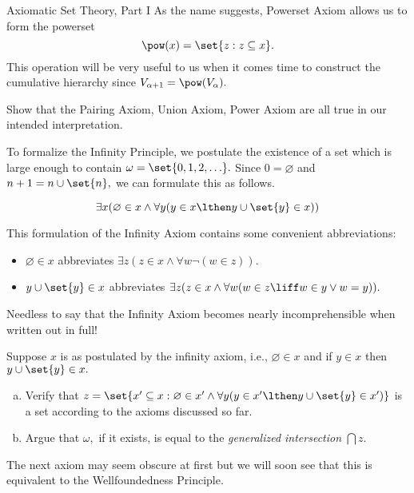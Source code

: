 \begin{unit}{Axiomatic Set Theory, Part I}
\noindent
As the name suggests, Powerset Axiom allows us to form the powerset \[\pow(x) = \set{ z : z \subseteq x}.\]
This operation will be very useful to us when it comes time to construct the cumulative hierarchy since \(V_{\alpha+1} = \pow(V_\alpha).\)

\begin{problem}
  Show that the Pairing Axiom, Union Axiom, Power Axiom are all true in our intended interpretation.
\end{problem}

To formalize the Infinity Principle, we postulate the existence of a set which is large enough to contain \(\omega = \set{0,1,2,\ldots}.\)
Since \(0 = \varnothing\) and \(n+1 = n \cup \set{n},\) we can formulate this as follows.

\begin{axiom}[Infinity]
  \[\exists x (\varnothing \in x \land \forall y(y \in x \lthen y \cup \set{y} \in x))\]
\end{axiom}

\noindent
This formulation of the Infinity Axiom contains some convenient abbreviations:
\begin{itemize}
\item \(\varnothing \in x\) abbreviates \(\exists z(z \in x \land \forall w\lnot(w \in z)).\)
\item \(y \cup \set{y} \in x\) abbreviates \(\exists z(z \in x \land \forall w(w \in z \liff w \in y \lor w = y)).\)
\end{itemize}
Needless to say that the Infinity Axiom becomes nearly incomprehensible when written out in full!

\begin{problem}
  Suppose \(x\) is as postulated by the infinity axiom, i.e., \(\varnothing \in x\) and if \(y \in x\) then \(y \cup \set{y} \in x.\)
  \begin{enumerate}[(a)]
  \item Verify that \(z = \set{ x' \subseteq x : \varnothing \in x' \land \forall y(y \in x' \lthen y \cup \set{y} \in x')}\) is a set according to the axioms discussed so far.
  \item Argue that \(\omega,\) if it exists, is equal to the \emph{generalized intersection} \(\bigcap z.\)
  \end{enumerate}
\end{problem}

The next axiom may seem obscure at first but we will soon see that this is equivalent to the Wellfoundedness Principle.


\end{unit}
